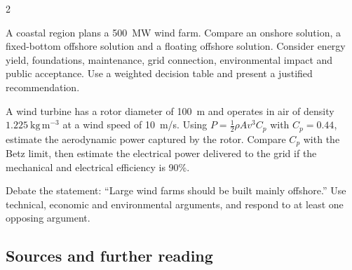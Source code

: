 \begin{multicols}{2}
\begin{challenge}
A coastal region plans a 500~MW wind farm. Compare an onshore solution, a fixed-bottom offshore solution and a floating offshore solution. Consider energy yield, foundations, maintenance, grid connection, environmental impact and public acceptance. Use a weighted decision table and present a justified recommendation.
\end{challenge}

\begin{applicationexercise}
A wind turbine has a rotor diameter of 100~m and operates in air of density $1.225~\mathrm{kg\,m^{-3}}$ at a wind speed of 10~m/s. Using $P=\tfrac12\rho A v^3 C_p$ with $C_p=0.44$, estimate the aerodynamic power captured by the rotor. Compare $C_p$ with the Betz limit, then estimate the electrical power delivered to the grid if the mechanical and electrical efficiency is 90\%.
\end{applicationexercise}

\begin{speaking}
Debate the statement: ``Large wind farms should be built mainly offshore.'' Use technical, economic and environmental arguments, and respond to at least one opposing argument.
\end{speaking}

\end{multicols}

\subsection*{Sources and further reading}
\quad
{}
